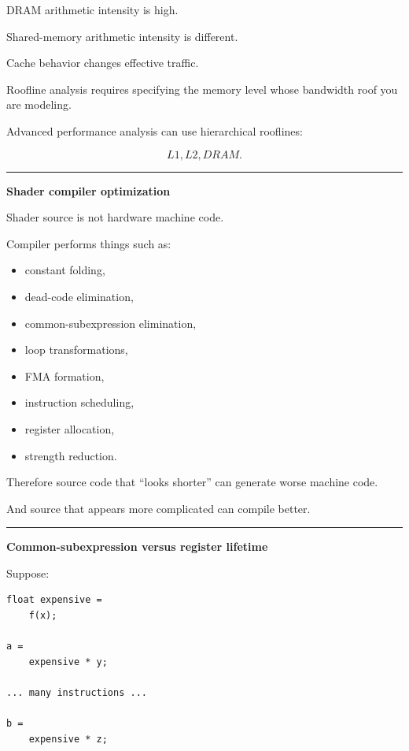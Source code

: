 DRAM arithmetic intensity is high.

Shared-memory arithmetic intensity is different.

Cache behavior changes effective traffic.

Roofline analysis requires specifying the memory level whose bandwidth roof you are modeling.

Advanced performance analysis can use hierarchical rooflines:

\[
L1,
L2,
DRAM.
\]

\begin{center}\rule{0.5\linewidth}{0.5pt}\end{center}

\textbf{Shader compiler optimization}

Shader source is not hardware machine code.

Compiler performs things such as:

\begin{itemize}
\tightlist
\item
  constant folding,
\item
  dead-code elimination,
\item
  common-subexpression elimination,
\item
  loop transformations,
\item
  FMA formation,
\item
  instruction scheduling,
\item
  register allocation,
\item
  strength reduction.
\end{itemize}

Therefore source code that ``looks shorter'' can generate worse machine code.

And source that appears more complicated can compile better.

\begin{center}\rule{0.5\linewidth}{0.5pt}\end{center}

\textbf{Common-subexpression versus register lifetime}

Suppose:

\protect{}\label{p10-cse}%
\begin{verbatim}
float expensive =
    f(x);

a =
    expensive * y;

... many instructions ...

b =
    expensive * z;
\end{verbatim}

